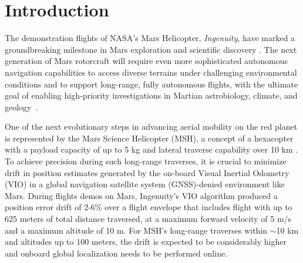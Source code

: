 \section{Introduction}
\label{sec:intro}


The demonstration flights of NASA's Mars Helicopter, \textit{Ingenuity}, have marked a groundbreaking milestone in Mars exploration and scientific discovery \cite{Grip2022}. The next generation of Mars rotorcraft will require even more sophisticated autonomous navigation capabilities to access diverse terrains under challenging environmental conditions and to support long-range, fully autonomous flights, with the ultimate goal of enabling high-priority investigations in Martian astrobiology, climate, and geology~\cite{Bapst2021Mars}. 

One of the next evolutionary steps in advancing aerial mobility on the red planet is represented by the Mars Science Helicopter (MSH), a concept of a hexacopter with a payload capacity of up to 5 kg and lateral traverse capability over 10 km \cite{Tzanetos2022}.
To achieve precision during such long-range traverses, it is crucial to minimize drift in position estimates generated by the on-board Visual Inertial Odometry (VIO) in a global navigation satellite system (GNSS)-denied environment like Mars. During flights demos on Mars, Ingenuity's VIO algorithm produced a position error drift of 2-6\% over a flight envelope that includes flight with up to 625 meters of total distance traversed, at a maximum forward velocity of 5 m/s and a maximum altitude of 10 m. 
For MSH’s long-range traverses within $\sim$10 km and altitudes up to 100 meters, the drift is expected to be considerably higher and onboard global localization needs to be performed online. 

